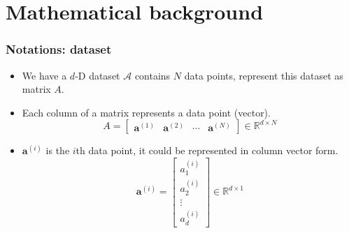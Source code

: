 \documentclass[serif]{beamer}
\begin{document}

\section{Mathematical background}
\begin{frame}
    \frametitle{Notations: dataset}
    \begin{itemize}
        \item We have a $d$-D dataset $\mathcal{A}$ contains $N$ data points, represent this dataset as \alert{matrix} $A$.
        \item Each column of a matrix represents a data point (vector).
        $$
        A = \begin{bmatrix}
            \mathbf{a}^{(1)} & \mathbf{a}^{(2)} & \cdots & \mathbf{a}^{(N)}
        \end{bmatrix}\in\mathbb{R}^{d\times N}
        $$
        \item $\mathbf{a}^{(i)}$ is the $i$th data point, it could be represented in column vector form.
        $$
        \mathbf{a}^{(i)} = \begin{bmatrix}
            a_1^{(i)}\\ a_2^{(i)}\\ \vdots \\ a_d^{(i)}
        \end{bmatrix}\in\mathbb{R}^{d\times 1}
        $$
    \end{itemize}
\end{frame}
\end{document}
